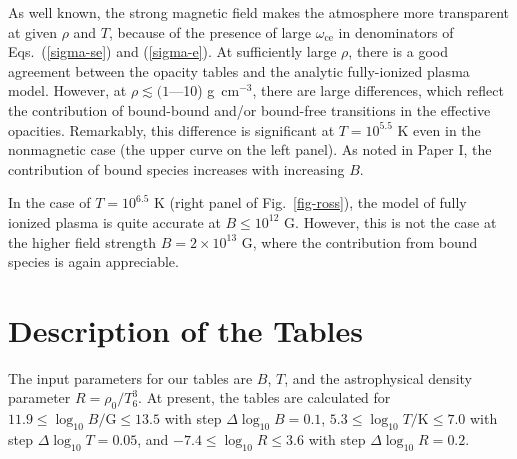 \documentclass{emulateapj}
\newcommand{\gcc}{\mbox{g cm$^{-3}$}}
\newcommand{\omc}{\omega_\mathrm{ce}}
\begin{document}
As well known, the strong magnetic field makes the atmosphere 
more transparent at given $\rho$ and $T$,
because of the presence of large $\omc$ in denominators of 
Eqs.\ (\ref{sigma-se}) and (\ref{sigma-e}).
At sufficiently large $\rho$, there is a good agreement between
the opacity tables and the analytic fully-ionized plasma model.
However, at $\rho\lesssim(1$---10) \gcc, there are large differences,
which reflect the contribution of bound-bound and/or bound-free
transitions in the effective opacities. Remarkably,
this difference is significant at $T=10^{5.5}$ K
even in the nonmagnetic case (the upper curve on the left panel).
As noted in Paper I, 
the contribution of bound species increases with increasing $B$.

In the case of $T=10^{6.5}$ K (right panel of Fig.\ \ref{fig-ross}),
the model of fully ionized plasma is quite accurate at $B\leq10^{12}$ G.
However, this is not the case
at the higher field strength $B=2\times10^{13}$ G, where the contribution
from bound species is again appreciable.

       \section{Description of the Tables}
\label{sect-tables}
%
The input parameters for our tables are $B$, $T$,
and the astrophysical density parameter $R=\rho_0/T_6^3$.
At present, the tables are calculated for 
$11.9\leq\log_{10} B/\mathrm{G}  \leq 13.5$ 
with step $\Delta\log_{10} B = 0.1$,
$5.3 \leq \log_{10} T/\mathrm{K} \leq 7.0$ 
with step $\Delta\log_{10} T = 0.05$,
and $-7.4\leq \log_{10} R \leq 3.6$
with step $\Delta\log_{10} R = 0.2$. 
\end{document}
